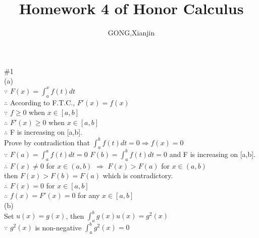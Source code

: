 \documentclass{article}
\author{GONG,Xianjin}
\title{Homework 4 of Honor Calculus}
\begin{document}
\maketitle

\vspace{3.5mm}

\textcolor[rgb]{0.00,0.00,0.50}{\#1}\\

(a)\\

$\because$ \qquad $\displaystyle F(x) = \int_a^xf(t)dt$\\

$\therefore$ \qquad According to F.T.C., $\displaystyle F'(x) = f(x)$\\

$\because$ \qquad $\displaystyle f \geq 0 $ when $\displaystyle x \in [a,b]$\\

$\therefore$ \qquad $\displaystyle F'(x) \geq 0$ when $\displaystyle x \in [a,b]$\\

$\therefore$ \qquad F is increasing on [a,b].\\

Prove by contradiction that $\displaystyle \int_a^b f(t)dt = 0 \Rightarrow f(x) = 0$\\

$\because$ \qquad $\displaystyle F(a) = \int_a^a f(t)dt = 0$ \qquad $\displaystyle F(b) = \int_a^b f(t)dt = 0$ \quad and F is increasing on [a,b].\\

$\therefore$ \qquad $\displaystyle F(x) \neq 0$ for $\displaystyle x \in (a,b)$ $\Rightarrow$ $F(x) > F(a)$ for $x \in (a,b)$\\

then $F(x) > F(b) = F(a)$ which is contradictory.\\

$\therefore$ \qquad $F(x) = 0$ for $x \in [a,b]$\\

$\therefore$ \qquad $f(x) = F'(x) = 0$ for any $x \in [a,b]$\\

(b)\\

Set $u(x) = g(x)$, then $\displaystyle \int_a^b g(x)u(x) = g^2(x)$\\

$\because$ \qquad $g^2(x)$ is non-negative \quad $\displaystyle \int_a^bg^2(x) = 0$\\
\end{document}
